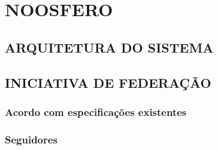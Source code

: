 \chapter{NOOSFERO}

\section{ARQUITETURA DO SISTEMA}


\section{INICIATIVA DE FEDERAÇÃO}


\subsection{Acordo com especificações existentes}

\subsection{Seguidores}
